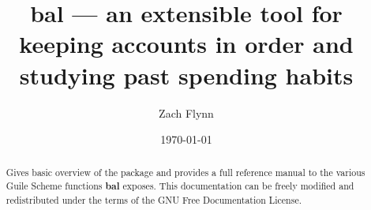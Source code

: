 \documentclass[12pt]{article}
\title{bal --- an extensible tool for keeping accounts in order and studying past spending habits}
\author{Zach Flynn}
\date{\today}
\theoremstyle{definition}
\begin{document}
\maketitle

\begin{abstract}
  Gives basic overview of the package and provides a full reference manual to the various Guile Scheme functions \textbf{bal} exposes.  This documentation can be freely modified and redistributed under the terms of the GNU Free Documentation License.
\end{abstract}
\end{document}
